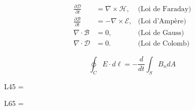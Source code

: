 \begin{equation}
    \label{eq:maxwell}
    \begin{aligned}
    \frac{\partial\mathcal{D}}{\partial t} & = \nabla\times\mathcal{H},   & \text{(Loi de Faraday)}\\
    \frac{\partial\mathcal{B}}{\partial t} & = -\nabla\times\mathcal{E},  & \text{(Loi d'Ampère)}\\
    \nabla\cdot\mathcal{B}                 & = 0,                         & \text{(Loi de Gauss)}\\
    \nabla\cdot\mathcal{D}                 & = 0.                         & \text{(Loi de Colomb)}
    \end{aligned}
\end{equation}

\[
    \oint_C {E \cdot d\ell = - \frac{d}{{dt}}} \int_S {B_n dA}
\]

L45 = \the\xlvchars\par
L65 = \the\lxvchars

\clearpage
\layout
